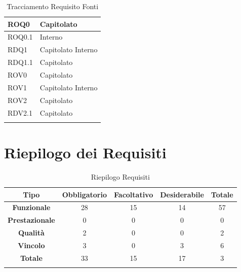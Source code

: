 \documentclass[../AnalisideiRequisiti.tex]{subfiles}
\begin{document}
\begin{longtable}{| p{4cm} | p{4cm} |}
\newline 
ROQ0&\newline Capitolato
\\[1em]
\hline
\newline 
ROQ0.1&\newline Interno
\\[1em]
\hline
\newline
RDQ1&\newline Capitolato \newline Interno
\\[1em]
\hline	
\newline
RDQ1.1&\newline Capitolato
\\[1em]
\hline
\newline 
ROV0&\newline Capitolato
\\[1em]
\hline	
\newline 
ROV1&\newline Capitolato \newline Interno
\\[1em]
\hline
\newline 
ROV2&\newline Capitolato
\\[1em]
\hline
\newline
RDV2.1&\newline Capitolato
\\[1em]
\hline
\caption{Tracciamento Requisito Fonti}
\end{longtable}
\section{Riepilogo dei Requisiti}
	\begin{longtable}{| c | c | c | c | c |}
	\hline
	\textbf{Tipo} & \textbf{Obbligatorio}& \textbf{Facoltativo} &\textbf{Desiderabile} &\textbf{Totale} \\
	\hline
	\endhead
\textbf{Funzionale} &28& 15 & 14 & 57\\

\hline\textbf{Prestazionale} &0& 0& 0 &0  \\

\hline\textbf{Qualità} &2& 0&0&2 \\

\hline\textbf{Vincolo}&3&0& 3 & 6 \\

\hline\textbf{Totale}&33& 15& 17 & 3 \\

\hline
\caption{Riepilogo Requisiti}
\end{longtable}
\end{document}
